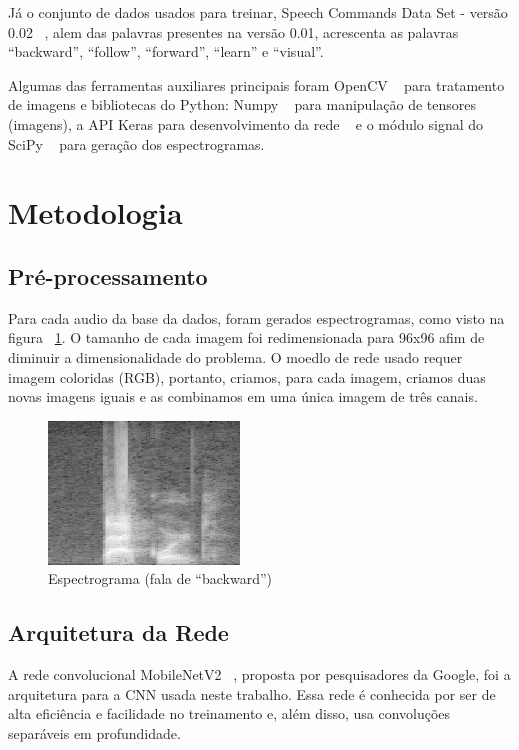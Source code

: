 \documentclass{bmvc2k}
\begin{document}
Já o conjunto de dados usados para treinar, Speech Commands Data Set - versão 0.02  ~\cite{speechcommandsv2}, alem das palavras presentes na versão 0.01, acrescenta as palavras ``backward'', ``follow'', ``forward'', ``learn'' e ``visual''.

Algumas das ferramentas auxiliares principais foram OpenCV ~\cite{openCV} para tratamento de imagens e bibliotecas do Python: Numpy ~\cite{numpy} para manipulação de tensores (imagens), a API Keras para desenvolvimento da rede ~\cite{keras} e o módulo signal do SciPy ~\cite{scipy} para geração dos espectrogramas.


\section{Metodologia}

\subsection*{Pré-processamento}

Para cada audio da base da dados, foram gerados espectrogramas, como visto na figura ~\ref{espc}. O tamanho de cada imagem foi redimensionada para 96x96 afim de diminuir a dimensionalidade do problema. O moedlo de rede usado requer imagem coloridas (RGB), portanto, criamos, para cada imagem, criamos duas novas imagens iguais e as combinamos em uma única imagem de três canais.


\begin{figure}[ht]
\centering
\includegraphics[scale=0.4]{imagens/spect.png} 
\caption{Espectrograma (fala de ``backward'')}
\label{espc}
\end{figure}

\subsection*{Arquitetura da Rede}

A rede convolucional MobileNetV2 ~\cite{mobilenets}, proposta por pesquisadores da Google, foi a arquitetura para a CNN usada neste trabalho. Essa rede é conhecida por ser de alta eficiência 
e facilidade no treinamento e, além disso, usa convoluções separáveis em profundidade.
\end{document}
